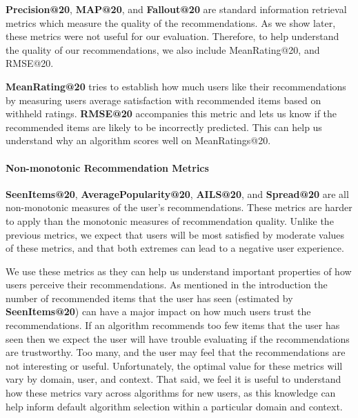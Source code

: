 \documentclass[letterpaper]{sig-alternate}
\begin{document}
  {\bf Precision@20}, {\bf MAP@20}, and {\bf Fallout@20} are standard information retrieval metrics which measure the quality of the recommendations.
  As we show later, these metrics were not useful for our evaluation.
  Therefore, to help understand the quality of our recommendations, we also include MeanRating@20, and RMSE@20.

  {\bf MeanRating@20} tries to establish how much users like their recommendations by measuring users average satisfaction with recommended items based on withheld ratings.
  {\bf RMSE@20} accompanies this metric and lets us know if the recommended items are likely to be incorrectly predicted. 
  This can help us understand why an algorithm scores well on MeanRatings@20.  
  
  \vspace{-0.5em}
  \paragraph{Non-monotonic Recommendation Metrics}
  {\bf SeenItems@20}, {\bf AveragePopularity@20}, {\bf AILS@20}, and {\bf Spread@20} are all non-monotonic measures of the user's recommendations.
  These metrics are harder to apply than the monotonic measures of recommendation quality.
  Unlike the previous metrics, we expect that users will be most satisfied by moderate values of these metrics, and that both extremes can lead to a negative user experience.

  We use these metrics as they can help us understand important properties of how users perceive their recommendations.
  As mentioned in the introduction the number of recommended items that the user has seen (estimated by {\bf SeenItems@20}) can have a major impact on how much users trust the recommendations.
  If an algorithm recommends too few items that the user has seen then we expect the user will have trouble evaluating if the recommendations are trustworthy.
  Too many, and the user may feel that the recommendations are not interesting or useful.
  Unfortunately, the optimal value for these metrics will vary by domain, user, and context.
  That said, we feel it is useful to understand how these metrics vary across algorithms for new users, as this knowledge can help inform default algorithm selection within a particular domain and context.
\end{document}
